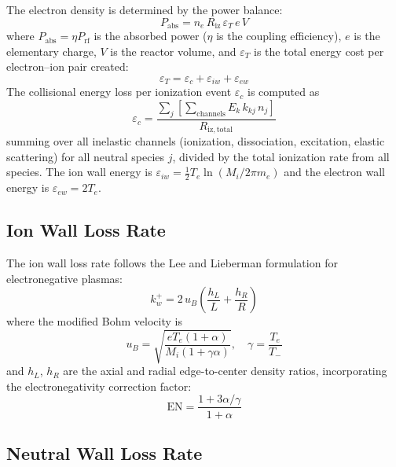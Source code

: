 \documentclass[11pt,a4paper]{article}
\newcommand{\Te}{T_e}
\newcommand{\nelec}{n_e}
\begin{document}
The electron density is determined by the power balance:
\begin{equation}
P_\mathrm{abs} = \nelec\, R_\mathrm{iz}\, \varepsilon_T\, e\, V
\label{eq:power_balance}
\end{equation}
where $P_\mathrm{abs} = \eta P_\mathrm{rf}$ is the absorbed power ($\eta$ is the coupling efficiency), $e$ is the elementary charge, $V$ is the reactor volume, and $\varepsilon_T$ is the total energy cost per electron--ion pair created:
\begin{equation}
\varepsilon_T = \varepsilon_c + \varepsilon_{iw} + \varepsilon_{ew}
\end{equation}
The collisional energy loss per ionization event $\varepsilon_c$ is computed as
\begin{equation}
\varepsilon_c = \frac{\displaystyle\sum_j \left[ \sum_{\text{channels}} E_k\, k_{kj}\, n_j \right]}{R_\mathrm{iz,total}}
\label{eq:Ec}
\end{equation}
summing over all inelastic channels (ionization, dissociation, excitation, elastic scattering) for all neutral species $j$, divided by the total ionization rate from all species.  The ion wall energy is $\varepsilon_{iw} = \frac{1}{2}\Te \ln(M_i / 2\pi m_e)$ and the electron wall energy is $\varepsilon_{ew} = 2\Te$.

\subsection{Ion Wall Loss Rate}

The ion wall loss rate follows the Lee and Lieberman formulation for electronegative plasmas:
\begin{equation}
k_w^+ = 2\, u_B \left( \frac{h_L}{L} + \frac{h_R}{R} \right)
\end{equation}
where the modified Bohm velocity is
\begin{equation}
u_B = \sqrt{\frac{e\Te(1+\alpha)}{M_i(1+\gamma\alpha)}}, \quad \gamma = \frac{\Te}{T_-}
\end{equation}
and $h_L$, $h_R$ are the axial and radial edge-to-center density ratios, incorporating the electronegativity correction factor:
\begin{equation}
\mathrm{EN} = \frac{1 + 3\alpha/\gamma}{1 + \alpha}
\end{equation}

\subsection{Neutral Wall Loss Rate}
\end{document}
